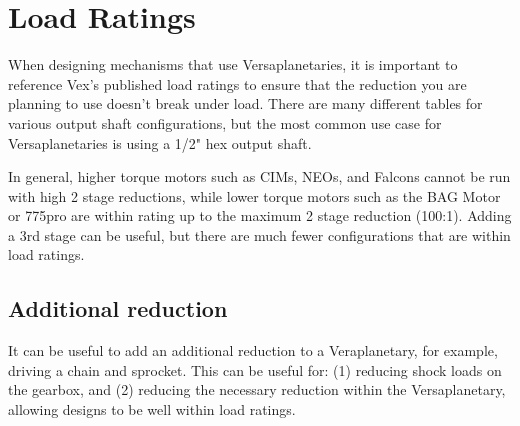 \documentclass[12pt, letterpaper]{article}
\begin{document}
\section{Load Ratings}
When designing mechanisms that use Versaplanetaries, it is important to reference Vex's published load ratings to ensure that the reduction you are planning to use doesn't break under load. There are many different tables for various output shaft configurations, but the most common use case for Versaplanetaries is using a 1/2" hex output shaft.

In general, higher torque motors such as CIMs, NEOs, and Falcons cannot be run with high 2 stage reductions, while lower torque motors such as the BAG Motor or 775pro are within rating up to the maximum 2 stage reduction (100:1). Adding a 3rd stage can be useful, but there are much fewer configurations that are within load ratings.

\subsection{Additional reduction}
It can be useful to add an additional reduction to a Veraplanetary, for example, driving a chain and sprocket. This can be useful for: (1) reducing shock loads on the gearbox, and (2) reducing the necessary reduction within the Versaplanetary, allowing designs to be well within load ratings.

\end{document}
